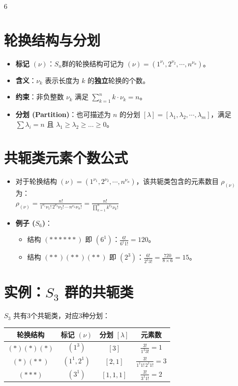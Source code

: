 \documentclass[landscape]{article}
\begin{document}
\begin{multicols*}{6}
\section*{轮换结构与分划}
\begin{itemize}
  \item \textbf{标记 $(\nu)$}：$S_n$群的轮换结构可记为 $(\nu) = (1^{\nu_1}, 2^{\nu_2}, \cdots, n^{\nu_n})$。
  \item \textbf{含义}：$\nu_k$ 表示长度为 $k$ 的\textbf{独立}轮换的个数。
  \item \textbf{约束}：非负整数 $\nu_k$ 满足 $\sum_{k=1}^n k \cdot \nu_k = n$。
  \item \textbf{分划 (Partition)}：也可描述为 $n$ 的分划 $[\lambda] = [\lambda_1, \lambda_2, \cdots, \lambda_m]$，满足 $\sum \lambda_i = n$ 且 $\lambda_1 \ge \lambda_2 \ge \dots \ge 0$。
\end{itemize}

\section*{共轭类元素个数公式}
\begin{itemize}
  \item 对于轮换结构 $(\nu)=(1^{\nu_1}, 2^{\nu_2}, \cdots, n^{\nu_n})$，该共轭类包含的元素数目 $\rho_{(\nu)}$ 为：
  \\
  $
  \rho_{(\nu)} = \frac{n!}{1^{\nu_1}\nu_1! \, 2^{\nu_2}\nu_2! \, \cdots \, n^{\nu_n}\nu_n!} = \frac{n!}{\prod_{k=1}^n k^{\nu_k} \nu_k!}
  $
  \item \textbf{例子 ($S_6$)}：
  \begin{itemize}
      \item 结构 $(******)$ 即 $(6^1)$：$\frac{6!}{6^1 1!} = 120$。
      \item 结构 $(**)(**)(**)$ 即 $(2^3)$：$\frac{6!}{2^3 3!} = \frac{720}{8 \times 6} = 15$。
  \end{itemize}
\end{itemize}

\section*{实例：$S_3$ 群的共轭类}
$S_3$ 共有3个共轭类，对应3种分划：
\begin{center}
\begin{tabular}{|c|c|c|c|}
\hline
\textbf{轮换结构} & \textbf{标记} $(\nu)$ & \textbf{分划} $[\lambda]$ & \textbf{元素数} \\
\hline
$(*)(*)(*)$ & $(1^3)$ & $[3]$ & $\frac{3!}{1^3 3!} = 1$ \\
\hline
$(*)(**)$ & $(1^1, 2^1)$ & $[2,1]$ & $\frac{3!}{1^1 1! \, 2^1 1!} = 3$ \\
\hline
$(***)$ & $(3^1)$ & $[1,1,1]$ & $\frac{3!}{3^1 1!} = 2$ \\
\hline
\end{tabular}
\end{center}


\end{multicols*}
\end{document}
